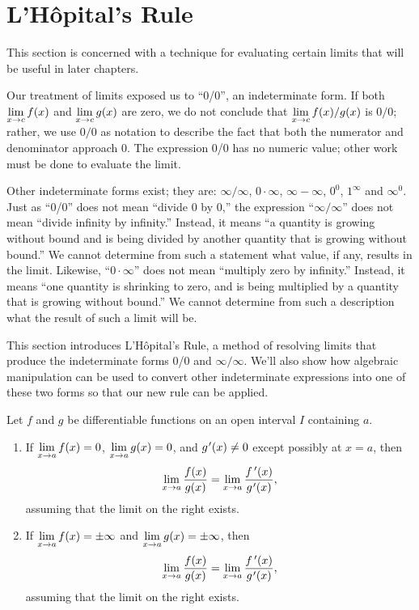 \section{L'Hôpital's Rule}\label{sec:lhopitals_rule}

This section is concerned with a technique for evaluating certain limits that will be useful in later chapters.

Our treatment of limits exposed us to ``0/0'', an indeterminate form. If both $\displaystyle \lim_{x\to c}f(x)$ and $\displaystyle \lim_{x\to c} g(x)$ are zero, we do not conclude that $\displaystyle \lim_{x\to c} f(x)/g(x)$ is $0/0$; rather, we use $0/0$ as notation to describe the fact that both the numerator and denominator approach 0. The expression 0/0 has no numeric value; other work must be done to evaluate the limit.

Other indeterminate forms exist; they are: $\infty/\infty$, $0\cdot\infty$, $\infty-\infty$, $0^0$, $1^\infty$ and $\infty^0$. Just as ``0/0'' does not mean ``divide 0 by 0,'' the expression ``$\infty/\infty$'' does not mean ``divide infinity by infinity.'' Instead, it means ``a quantity is growing without bound and is being divided by another quantity that is growing without bound.'' We cannot determine from such a statement what value, if any, results in the limit. Likewise, ``$0\cdot \infty$'' does not mean ``multiply zero by infinity.'' Instead, it means ``one quantity is shrinking to zero, and is being multiplied by a quantity that is growing without bound.'' We cannot determine from such a description what the result of such a limit will be.

This section introduces L'Hôpital's Rule, a method of resolving limits that produce the indeterminate forms 0/0 and $\infty/\infty$. We'll also show how algebraic manipulation can be used to convert other indeterminate expressions into one of these two forms so that our new rule can be applied.

\begin{theorem}\label{thm:LHR_1}%
Let $f$ and $g$ be differentiable functions on an open interval $I$ containing $a$.
\begin{enumerate}
\item If $\displaystyle\lim_{x\to a}f(x)=0$, $\displaystyle\lim_{x\to a}g(x)=0$, and $g\primeskip'(x)\neq 0$ except possibly at $x=a$, then \[\lim_{x\to a}\frac{f(x)}{g(x)}=\lim_{x\to a} \frac{\fp(x)}{g\primeskip'(x)},\]
assuming that the limit on the right exists.
\item If  $\displaystyle\lim_{x\to a}f(x)=\pm\infty$ and $\displaystyle\lim_{x\to a}g(x)=\pm\infty$, then \[\lim_{x\to a}\frac{f(x)}{g(x)}=\lim_{x\to a} \frac{\fp(x)}{g\primeskip'(x)},\]
assuming that the limit on the right exists.
\end{enumerate}
\end{theorem}

